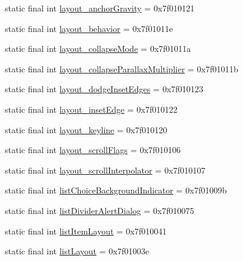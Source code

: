 \begin{CompactItemize}
\item 
static final int \hyperlink{classandroid_1_1support_1_1v7_1_1recyclerview_1_1_r_1_1attr_905f579f1b976d15354da3727c3affd2}{layout\_\-anchorGravity} = 0x7f010121
\item 
static final int \hyperlink{classandroid_1_1support_1_1v7_1_1recyclerview_1_1_r_1_1attr_af774f55b50ff9e67cb69b3b0290879c}{layout\_\-behavior} = 0x7f01011e
\item 
static final int \hyperlink{classandroid_1_1support_1_1v7_1_1recyclerview_1_1_r_1_1attr_fcbc093d8e0a9375b53b7c602341093d}{layout\_\-collapseMode} = 0x7f01011a
\item 
static final int \hyperlink{classandroid_1_1support_1_1v7_1_1recyclerview_1_1_r_1_1attr_f6b160d6ee5d8a338d306ac28180ec4d}{layout\_\-collapseParallaxMultiplier} = 0x7f01011b
\item 
static final int \hyperlink{classandroid_1_1support_1_1v7_1_1recyclerview_1_1_r_1_1attr_6144da827e29d16fb524c418e4fee782}{layout\_\-dodgeInsetEdges} = 0x7f010123
\item 
static final int \hyperlink{classandroid_1_1support_1_1v7_1_1recyclerview_1_1_r_1_1attr_7e20c5263d0df148ecde5c4faa3ef8f5}{layout\_\-insetEdge} = 0x7f010122
\item 
static final int \hyperlink{classandroid_1_1support_1_1v7_1_1recyclerview_1_1_r_1_1attr_ac445006cc012145181b4240e3a08f25}{layout\_\-keyline} = 0x7f010120
\item 
static final int \hyperlink{classandroid_1_1support_1_1v7_1_1recyclerview_1_1_r_1_1attr_9b292fe976f2043a0552be25f87b7bbb}{layout\_\-scrollFlags} = 0x7f010106
\item 
static final int \hyperlink{classandroid_1_1support_1_1v7_1_1recyclerview_1_1_r_1_1attr_d239ad3fff0773e5cd7f2d7d83078433}{layout\_\-scrollInterpolator} = 0x7f010107
\item 
static final int \hyperlink{classandroid_1_1support_1_1v7_1_1recyclerview_1_1_r_1_1attr_2c24ef2561c2fdcbce0cde041af793b8}{listChoiceBackgroundIndicator} = 0x7f01009b
\item 
static final int \hyperlink{classandroid_1_1support_1_1v7_1_1recyclerview_1_1_r_1_1attr_1687057df1099a185a057ae49684e239}{listDividerAlertDialog} = 0x7f010075
\item 
static final int \hyperlink{classandroid_1_1support_1_1v7_1_1recyclerview_1_1_r_1_1attr_065405f5cac62be80c25ffd1425e1476}{listItemLayout} = 0x7f010041
\item 
static final int \hyperlink{classandroid_1_1support_1_1v7_1_1recyclerview_1_1_r_1_1attr_ec88c0720886737eed6df11c4688e77e}{listLayout} = 0x7f01003e

\end{CompactItemize}

